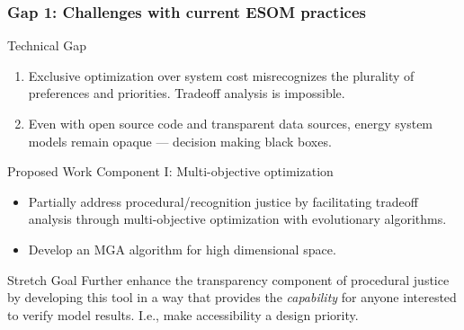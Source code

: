 \begin{frame}
    \frametitle{Gap 1: Challenges with current ESOM practices}
    \begin{block}{Technical Gap}
        \begin{enumerate}
            \item Exclusive optimization over system cost misrecognizes the plurality of 
            preferences and priorities. Tradeoff analysis is impossible.
            \item Even with open source code and transparent data sources, energy system
            models remain opaque --- decision making black boxes.
        \end{enumerate}
    \end{block}
    \begin{block}{Proposed Work Component I: Multi-objective optimization}
        \begin{itemize}
            \item Partially address procedural/recognition justice by facilitating tradeoff analysis 
            through multi-objective optimization with evolutionary
            algorithms.
            \item Develop an MGA algorithm for high dimensional space.
        \end{itemize}
        
    \end{block}
    \begin{block}{Stretch Goal}
        Further enhance the transparency component of procedural justice by developing this
        tool in a way that provides the \textit{capability} for anyone interested to 
        verify model results. I.e., make accessibility a design priority. 
    \end{block}
\end{frame}